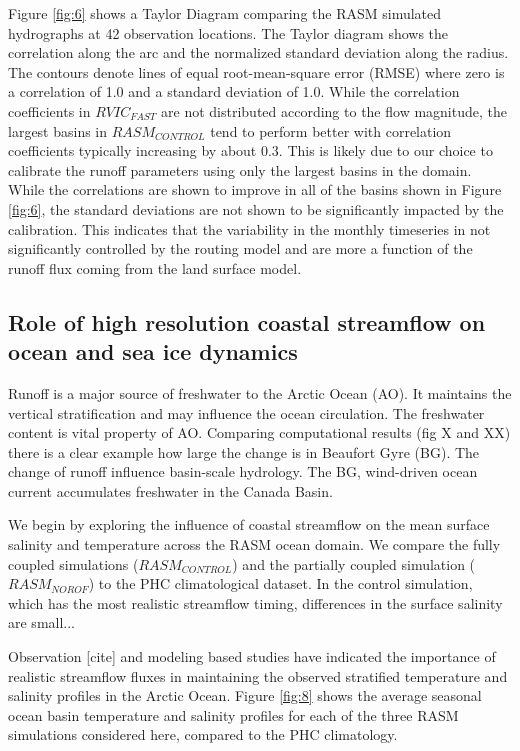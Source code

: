 \documentclass[jgrga, draft]{agutex}
\begin{document}
\begin{article}
Figure \ref{fig:6} shows a Taylor Diagram comparing the RASM simulated hydrographs at 42 observation locations.
The Taylor diagram shows the correlation along the arc and the normalized standard deviation along the radius.
The contours denote lines of equal root-mean-square error (RMSE) where zero is a correlation of 1.0 and a standard deviation of 1.0.
While the correlation coefficients in $RVIC_{FAST}$ are not distributed according to the flow magnitude, the largest basins in $RASM_{CONTROL}$ tend to perform better with correlation coefficients typically increasing by about 0.3.
This is likely due to our choice to calibrate the runoff parameters using only the largest basins in the domain.
While the correlations are shown to improve in all of the basins shown in Figure \ref{fig:6}, the standard deviations are not shown to be significantly impacted by the calibration.
This indicates that the variability in the monthly timeseries in not significantly controlled by the routing model and are more a function of the runoff flux coming from the land surface model.

\subsection{Role of high resolution coastal streamflow on ocean and sea ice dynamics}
Runoff is a major source of freshwater to the Arctic Ocean (AO). It maintains the vertical stratification and may influence the ocean circulation.
The freshwater content is vital property of AO.
Comparing computational results (fig X and XX) there is a clear example how large the change is in Beaufort Gyre (BG).
The change of runoff influence basin-scale hydrology.
The BG, wind-driven ocean current accumulates freshwater in the Canada Basin.

We begin by exploring the influence of coastal streamflow on the mean surface salinity and temperature across the RASM ocean domain.
We compare the fully coupled simulations ($RASM_{CONTROL}$) and the partially coupled simulation ($RASM_{NOROF}$) to the PHC climatological dataset.
In the control simulation, which has the most realistic streamflow timing, differences in the surface salinity are small...

Observation [cite] and modeling \citep[e.g.][]{Nummelin_2015} based studies have indicated the importance of realistic streamflow fluxes in maintaining the observed stratified temperature and salinity profiles in the Arctic Ocean.
Figure \ref{fig:8} shows the average seasonal ocean basin temperature and salinity profiles for each of the three RASM simulations considered here, compared to the PHC climatology.


\end{article}
\end{document}
